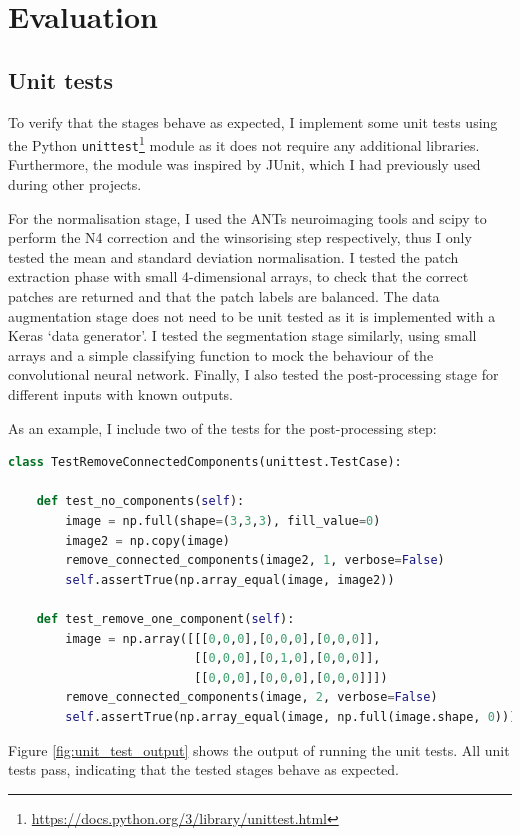 \documentclass[12pt,a4paper,twoside,openright]{report}
\begin{document}
\chapter{Evaluation}

\section{Unit tests}
To verify that the stages behave as expected, I implement some unit tests using the Python \texttt{unittest}\footnote{\url{https://docs.python.org/3/library/unittest.html}} module as it does not require any additional libraries. Furthermore, the module was inspired by JUnit, which I had previously used during other projects.

 For the normalisation stage, I used the ANTs neuroimaging tools and scipy to perform the N4 correction and the winsorising step respectively, thus I only tested the mean and standard deviation normalisation. I tested the patch extraction phase with small 4-dimensional arrays, to check that the correct patches are returned and that the patch labels are balanced. The data augmentation stage does not need to be unit tested as it is implemented with a Keras `data generator'. I tested the segmentation stage similarly, using small arrays and a simple classifying function to mock the behaviour of the convolutional neural network. Finally, I also tested the post-processing stage for different inputs with known outputs.
 
As an example, I include two of the tests for the post-processing step:
\begin{lstlisting}[language=Python]
	class TestRemoveConnectedComponents(unittest.TestCase):

    def test_no_components(self):
        image = np.full(shape=(3,3,3), fill_value=0)
        image2 = np.copy(image)
        remove_connected_components(image2, 1, verbose=False)
        self.assertTrue(np.array_equal(image, image2))
    
    def test_remove_one_component(self):
        image = np.array([[[0,0,0],[0,0,0],[0,0,0]],
                          [[0,0,0],[0,1,0],[0,0,0]],
                          [[0,0,0],[0,0,0],[0,0,0]]])
        remove_connected_components(image, 2, verbose=False)
        self.assertTrue(np.array_equal(image, np.full(image.shape, 0)))
\end{lstlisting}

Figure \ref{fig:unit_test_output} shows the output of running the unit tests. All unit tests pass, indicating that the tested stages behave as expected.
\end{document}
